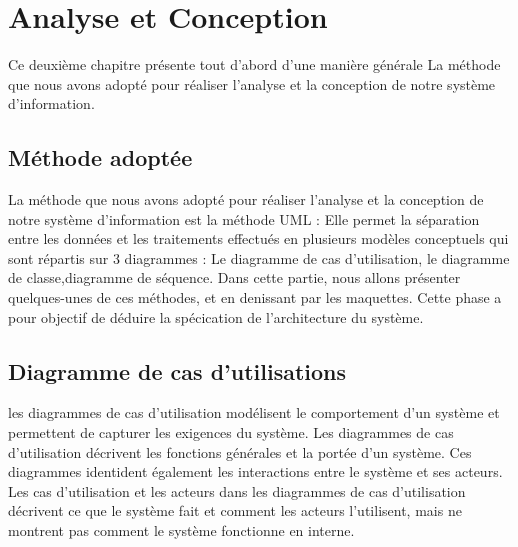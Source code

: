 \chapter{Analyse et Conception}
\vspace{5cm}
\large{Ce deuxième chapitre présente tout d’abord d’une manière générale La méthode que nous avons adopté pour réaliser l'analyse et la conception de notre système d'information.\\}


\newpage
\section{Méthode adoptée}
\large{La méthode que nous avons adopté pour réaliser l'analyse et la conception de notre système d'information est la méthode UML : Elle permet la séparation entre les données et les traitements effectués en plusieurs modèles conceptuels qui sont répartis sur 3 diagrammes : Le diagramme de cas d'utilisation, le diagramme de classe,diagramme de séquence. Dans cette partie, nous allons présenter quelques-unes de ces méthodes, et en denissant par les maquettes. Cette phase a pour objectif de déduire la spécication de l'architecture du système.\\}
\section{Diagramme de cas d'utilisations}
\large{les diagrammes de cas d'utilisation modélisent le comportement d'un système et permettent de capturer les exigences du système. Les diagrammes de cas d'utilisation décrivent les fonctions générales et la portée d'un système. Ces diagrammes identident également les interactions entre le système et ses acteurs. Les cas d'utilisation et les acteurs dans les diagrammes de cas d'utilisation décrivent ce que le système fait et comment les acteurs l'utilisent, mais ne montrent pas comment le système fonctionne en interne.}


